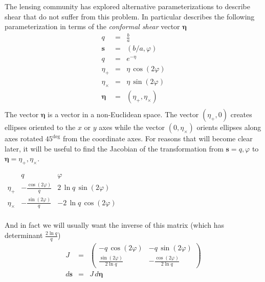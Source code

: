 \documentclass[modern]{aastex62}
\begin{document}
The lensing community has explored alternative parameterizations to describe shear that do not suffer from this problem.
In particular \citet{bernstein02} describes the following parameterization in terms of the \emph{conformal shear}  vector $\pmb{\eta}$
\begin{eqnarray}
  q & = & \frac{b}{a} \\
  \pmb{s} & = & (b/a, \varphi) \\
  q & = & e^{-\eta} \\
  \eta_+ & = & \eta \, \cos (2\varphi) \\
  \eta_\times & = & \eta \, \sin (2\varphi) \\
  \pmb{\eta} & = &  ( \eta_+, \eta_\times) \\
\end{eqnarray}
The vector $\pmb{\eta}$ is a vector in a non-Euclidean space.  The vector $( \eta_+, 0)$ creates ellipses oriented to the $x$ or $y$ axes while the vector $ (0, \eta_\times)$ orients ellipses along axes rotated $45^{\deg}$ from the coordinate axes.
For reasons that will become clear later, it will be useful to find the Jacobian of the transformation from $\pmb{s} = q, \varphi$ to $\pmb{\eta} = \eta_+, \eta_\times$.
\begin{center}
$
\begin{array}{c|cc}
 & q & \varphi \\
\hline
\eta_+           &  -\frac{\cos(2 \varphi)}{q} & 2 \, \ln q \, \sin(2 \varphi) \\
\eta_\times   & -\frac{\sin(2 \varphi)}{q}  & -2 \, \ln q \, \cos(2 \varphi) \\
\end{array}
$
\end{center}
And in fact we will usually want the inverse of this matrix (which has determinant $\frac{2\ln q}{q}$)
\begin{eqnarray}
  J  & =  & \begin{pmatrix} - q \, \cos(2\varphi) & - q \, \sin(2 \varphi) \\
    \frac{\sin(2 \varphi)}{2\ln q} & -\frac{\cos(2 \varphi)}{2\ln q}
    \end{pmatrix} \\
d\pmb{s} & = & J \, d\pmb{\eta}    
\end{eqnarray}
\end{document}
